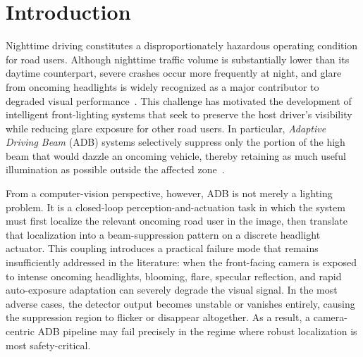 \documentclass[pdflatex,sn-mathphys-num]{sn-jnl}%
\theoremstyle{thmstyleone}%
\theoremstyle{thmstyletwo}%
\theoremstyle{thmstylethree}%
\begin{document}
\section{Introduction}
\label{sec:intro}

Nighttime driving constitutes a disproportionately hazardous operating
condition for road users. Although nighttime traffic volume is
substantially lower than its daytime counterpart, severe crashes occur
more frequently at night, and glare from oncoming headlights is widely
recognized as a major contributor to degraded visual
performance~\cite{fhwa2025nightvisibility,hwang2018headlightglare,beard2025glarelitreview}.
This challenge has motivated the development of intelligent front-lighting systems that seek to preserve the host driver's visibility while
reducing glare exposure for other road users. In particular, \emph{Adaptive Driving Beam} (ADB) systems selectively suppress only the portion of the high beam that would dazzle an oncoming vehicle, thereby retaining as much useful illumination as possible outside the affected zone~\cite{Neumann2014ADB,Shin2026DOE_AFS}.

From a computer-vision perspective, however, ADB is not merely a lighting problem. It is a closed-loop perception-and-actuation task in which the system must first localize the relevant oncoming road user in the image, then translate that localization into a beam-suppression pattern on a discrete headlight actuator. This coupling introduces a practical failure mode that remains insufficiently addressed in the literature: when the front-facing camera is exposed to intense oncoming headlights, blooming, flare, specular reflection, and rapid auto-exposure adaptation can severely degrade the visual signal. In the
most adverse cases, the detector output becomes unstable or vanishes entirely, causing the suppression region to flicker or disappear altogether. As a
result, a camera-centric ADB pipeline may fail precisely in the regime where robust localization is most safety-critical.
\end{document}
